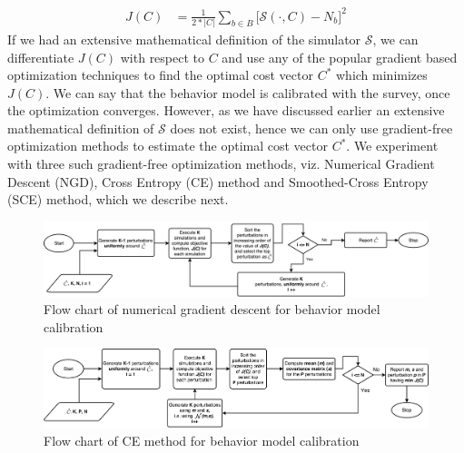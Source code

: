 \documentclass[doublespace,draft]{VTthesis}
\begin{document}
    \begin{align}
        J(C) &= \frac{1}{2 * |C|} \sum_{b \in B}\bigg[ \mathscr{S}(\cdot, C) - N_{b} \bigg]^2
    	\label{eqn:objfn2}
    \end{align}
    If we had an extensive mathematical definition of the simulator $\mathscr{S}$, we can differentiate $J(C)$ with respect to $C$ and use any of the popular gradient based optimization techniques to find the optimal cost vector $C^*$ which minimizes $J(C)$. We can say that the behavior model is calibrated with the survey, once the optimization converges. However, as we have discussed earlier an extensive mathematical definition of $\mathscr{S}$ does not exist, hence we can only use gradient-free optimization methods to estimate the optimal cost vector $C^*$. We experiment with three such gradient-free optimization methods, viz. Numerical Gradient Descent (NGD), Cross Entropy (CE) method and Smoothed-Cross Entropy (SCE) method, which we describe next. 
    \begin{figure}[H]
    \centering
    \includegraphics[width=\textwidth]{figures/ngd.pdf}
    \caption{Flow chart of numerical gradient descent for behavior model calibration}
    \label{fig:ngd}
    \end{figure}
    \begin{figure}[H]
    \centering
    \includegraphics[width=\textwidth]{figures/cem.pdf}
    \caption{Flow chart of CE method for behavior model calibration}
    \label{fig:cem}
    \end{figure}
\end{document}
